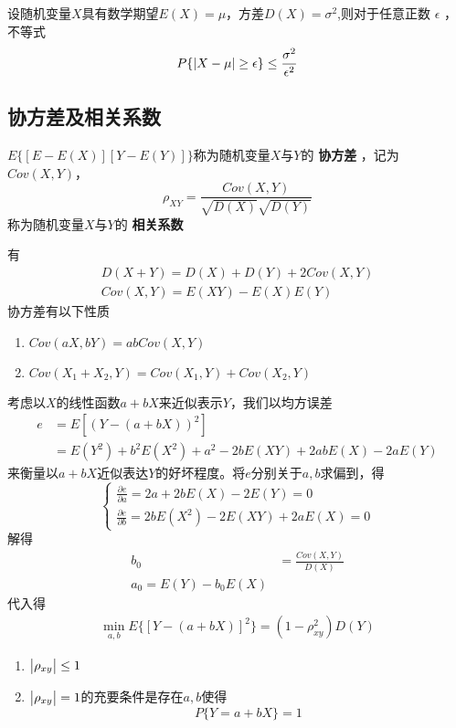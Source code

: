 \documentclass[11pt]{article}
\begin{document}
\begin{definition}[切比雪夫不等式]
设随机变量\(X\)具有数学期望\(E(X)=\mu\)，方差\(D(X)=\sigma^2\),则对于任意正数
\(\epsilon\) ，不等式
\begin{equation*}
P\{\abs{X-\mu}\ge\epsilon\}\le\frac{\sigma^2}{\epsilon^2}
\end{equation*}
\end{definition}
\subsection{协方差及相关系数}
\label{sec:org1f510ad}
\begin{definition}[]
\(E\{[E-E(X)][Y-E(Y)]\}\)称为随机变量\(X\)与\(Y\)的 \textbf{协方差} ，记为
\(Cov(X,Y)\)，
\begin{equation*}
\rho_{XY}=\frac{Cov(X,Y)}{\sqrt{D(X)}\sqrt{D(Y)}}
\end{equation*}
称为随机变量\(X\)与\(Y\)的 \textbf{相关系数} 
\end{definition}

有
\begin{gather*}
D(X+Y)=D(X)+D(Y)+2Cov(X,Y)\\
Cov(X,Y)=E(XY)-E(X)E(Y)
\end{gather*}
协方差有以下性质
\begin{enumerate}
\item \(Cov(aX,bY)=abCov(X,Y)\)
\item \(Cov(X_1+X_2,Y)=Cov(X_1,Y)+Cov(X_2,Y)\)
\end{enumerate}


考虑以\(X\)的线性函数\(a+bX\)来近似表示\(Y\)，我们以均方误差
\begin{align*}
e&=E[(Y-(a+bX))^2]\\
&=E(Y^2)+b^2E(X^2)+a^2-2bE(XY)+2abE(X)-2aE(Y)
\end{align*}
来衡量以\(a+bX\)近似表达\(Y\)的好坏程度。将\(e\)分别关于\(a,b\)求偏到，得
\begin{equation*}
\begin{cases}
\frac{\partial e}{\partial a}=2a+2bE(X)-2E(Y)=0\\
\frac{\partial e}{\partial b}=2bE(X^2)-2E(XY)+2aE(X)=0
\end{cases}
\end{equation*}
解得
\begin{align*}
b_0&=\frac{Cov(X,Y)}{D(X)}\\
a_0=E(Y)-b_0E(X)
\end{align*}
代入得
\begin{align*}
\min_{a,b}E\{[Y-(a+bX)]^2\}=(1-\rho^2_{xy})D(Y)
\end{align*}
\begin{theorem}[]
\begin{enumerate}
\item \(\abs{\rho_{xy}}\le1\)
\item \(\abs{\rho_{xy}}=1\)的充要条件是存在\(a,b\)使得
\begin{equation*}
P\{Y=a+bX\}=1
\end{equation*}
\end{enumerate}
\end{theorem}
\end{document}
